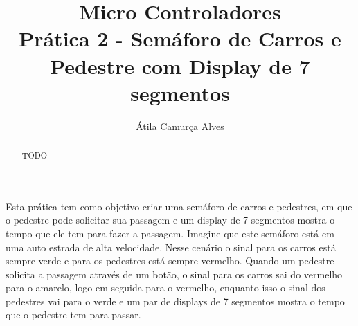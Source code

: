 \documentclass[12pt]{article}
\title{Micro Controladores\\Prática 2 - Semáforo de Carros e Pedestre com Display de 7 segmentos}
\author{Átila Camurça Alves}
\begin{document}
\maketitle

\begin{abstract}
  TODO
\end{abstract}
     
\begin{resumo}
  Esta prática tem como objetivo criar uma semáforo de carros e pedestres, em
  que o pedestre pode solicitar sua passagem e um display de 7 segmentos mostra
  o tempo que ele tem para fazer a passagem. Imagine que este semáforo está em 
  uma auto estrada de alta velocidade. Nesse cenário o sinal para os carros está
  sempre verde e para os pedestres está sempre vermelho. Quando um pedestre solicita
  a passagem através de um botão, o sinal para os carros sai do vermelho para o amarelo,
  logo em seguida para o vermelho, enquanto isso o sinal dos pedestres vai para o
  verde e um par de displays de 7 segmentos mostra o tempo que o pedestre tem para passar.
\end{resumo}





\end{document}
